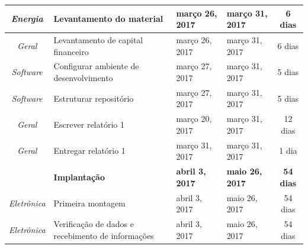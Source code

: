 \begin{longtable}{|c|m{6.5cm}|m{3.2cm}|m{3.2cm}|c|}
\textit{Energia}                                                          & Levantamento do material                             & março 26, 2017                       & março 31, 2017                    & 6 dias                                \\ \hline
\textit{Geral}                                                            & Levantamento de capital financeiro                   & março 26, 2017                       & março 31, 2017                    & 6 dias                                \\ \hline
\textit{Software}                                                         & Configurar ambiente de desenvolvimento               & março 27, 2017                       & março 31, 2017                    & 5 dias                                \\ \hline
\textit{Software}                                                         & Estruturar repositório                               & março 27, 2017                       & março 31, 2017                    & 5 dias                                \\ \hline
\textit{Geral}                                                            & Escrever relatório 1                                 & março 20, 2017                       & março 31, 2017                    & 12 dias                               \\ \hline
\textit{Geral}                                                            & Entregar relatório 1                                 & março 31, 2017                       & março 31, 2017                    & 1 dia                                 \\ \hline
\textit{}                                                                 & \textbf{Implantação}                                 & \textbf{abril 3, 2017}               & \textbf{maio 26, 2017}            & \textbf{54 dias}                      \\ \hline
\textit{Eletrônica}                                                       & Primeira montagem                                    & abril 3, 2017                        & maio 26, 2017                     & 54 dias                               \\ \hline
\textit{Eletrônica}                                                       & Verificação de dados e recebimento de informações    & abril 3, 2017                        & maio 26, 2017                     & 54 dias                               \\ \hline

\end{longtable}
